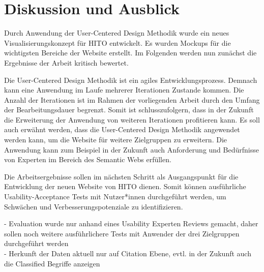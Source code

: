 \chapter{Diskussion und Ausblick}\label{ch:discussion}
Durch Anwendung der User-Centered Design Methodik wurde ein neues Visualisierungskonzept für HITO entwickelt.
Es wurden Mockups für die wichtigsten Bereiche der Website erstellt.
Im Folgenden werden nun zunächst die Ergebnisse der Arbeit kritisch bewertet.

Die User-Centered Design Methodik ist ein agiles Entwicklungsprozess.
Demnach kann eine Anwendung im Laufe mehrerer Iterationen Zustande kommen.
Die Anzahl der Iterationen ist im Rahmen der vorliegenden Arbeit durch den Umfang der Bearbeitungsdauer begrenzt.
Somit ist schlusszufolgern, dass in der Zukunft die Erweiterung der Anwendung von weiteren Iterationen profitieren kann.
Es soll auch erwähnt werden, dass die User-Centered Design Methodik angewendet werden kann, um die Website für weitere Zielgruppen zu erweitern.
Die Anwendung kann zum Beispiel in der Zukunft auch Anforderung und Bedürfnisse von Experten im Bereich des Semantic Webs erfüllen.

Die Arbeitsergebnisse sollen im nächsten Schritt als Ausgangspunkt für die Entwicklung der neuen Website von HITO dienen.
Somit können ausführliche Usability-Acceptance Tests mit Nutzer*innen durchgeführt werden, um Schwächen und Verbesserungspotenziale zu identifizieren.

- Evaluation wurde nur anhand eines Usability Experten Reviews gemacht, daher sollen noch weitere ausführlichere Tests mit Anwender der drei Zielgruppen durchgeführt werden \\
- Herkunft der Daten aktuell nur auf Citation Ebene, evtl. in der Zukunft auch die Classified Begriffe anzeigen

